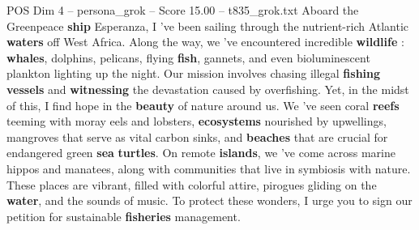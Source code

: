 \begin{textsample}{POS Dim 4 – persona\_grok – Score 15.00 – t835\_grok.txt}  \label{ex:f4_pos_038}
Aboard the Greenpeace \textbf{ship} Esperanza, I 've been sailing through the nutrient-rich Atlantic \textbf{waters} off West Africa.
Along the way, we 've encountered incredible \textbf{wildlife} : \textbf{whales}, dolphins, pelicans, flying \textbf{fish}, gannets, and even bioluminescent plankton lighting up the night.
Our mission involves chasing illegal \textbf{fishing} \textbf{vessels} and \textbf{witnessing} the devastation caused by overfishing.
Yet, in the midst of this, I find hope in the \textbf{beauty} of nature around us.
We 've seen coral \textbf{reefs} teeming with moray eels and lobsters, \textbf{ecosystems} nourished by upwellings, mangroves that serve as vital carbon sinks, and \textbf{beaches} that are crucial for endangered green \textbf{sea} \textbf{turtles}.
On remote \textbf{islands}, we 've come across marine hippos and manatees, along with communities that live in symbiosis with nature.
These places are vibrant, filled with colorful attire, pirogues gliding on the \textbf{water}, and the sounds of music.
To protect these wonders, I urge you to sign our petition for sustainable \textbf{fisheries} management.

\end{textsample}
